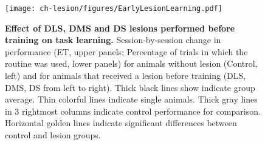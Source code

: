 \begin{figure}[bth!]
  \begin{center}
	\texttt{[image: ch-lesion/figures/EarlyLesionLearning.pdf]}
	\caption[Effects of Striatal Lesions on Learning]
	{\textbf{Effect of DLS, DMS and DS lesions performed before training on task learning.}
	Session-by-session change in performance (ET, upper panels; Percentage of trials in which the routine was used, lower panels) for animals without lesion (Control, left) and for animals that received a lesion before training (DLS, DMS, DS from left to right). 
	Thick black lines show indicate group average.
    Thin colorful lines indicate single animals.
    Thick gray lines in 3 rightmost columns indicate control performance for comparison.
    Horizontal golden lines indicate significant differences between control and lesion groups. 
	}
	\label{fig:lesion:EarlyLesionLearning}
  \end{center}
\end{figure}